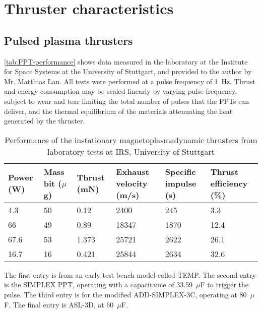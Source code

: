 \chapter{Thruster characteristics} \label{cha:Thruster-characteristics}

\section{Pulsed plasma thrusters}\label{sec:PPT-characteristics}

\autoref{tab:PPT-performance} shows data measured in the laboratory at the Institute for Space Systems at the University of Stuttgart, and provided to the author by Mr. Matthias Lau. All tests were performed at a pulse frequency of 1~Hz. Thrust and energy consumption may be scaled linearly by varying pulse frequency, subject to wear and tear limiting the total number of pulses that the PPTs can deliver, and the thermal equilibrium of the materials attenuating the heat generated by the thruster.

\begin{table}[h]
\caption{Performance of the instationary magnetoplasmadynamic thrusters from laboratory tests at IRS, University of Stuttgart}
\label{tab:PPT-performance}
\begin{center}
\begin{tabular}{C{0.1\textwidth} C{0.1\textwidth} C{0.1\textwidth} C{0.12\textwidth} C{0.12\textwidth} C{0.13\textwidth}}\toprule
Power (W) &  Mass bit ($\mu$g) & Thrust (mN) & Exhaust velocity (m/s) & Specific impulse (s) & Thrust efficiency (\%) \tabularnewline\midrule
4.3 & 50 & 0.12 & 2400 & 245 & 3.3 \tabularnewline
66 & 49 & 0.89 &  18347 & 1870 & 12.4 \tabularnewline
67.6 & 53 & 1.373 & 25721 & 2622 & 26.1 \tabularnewline
16.7 & 16 & 0.421 & 25844 & 2634 & 32.6 \tabularnewline\bottomrule
\end{tabular}
\end{center}
\end{table}

The first entry is from an early test bench model called TEMP. The second entry is the SIMPLEX PPT, operating with a capacitance of 33.59~$\mu$F to trigger the pulse. The third entry is for the modified ADD-SIMPLEX-3C, operating at 80~$\mu$F. The final entry is ASL-3D, at 60~$\mu$F.


